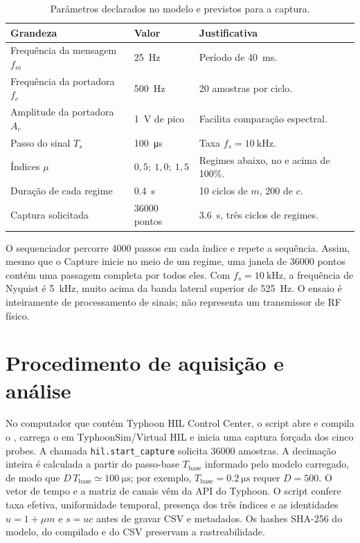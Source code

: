 \documentclass[11pt,a4paper]{article}
\newcommand{\arquivo}[1]{\texttt{\detokenize{#1}}}
\begin{document}
\begin{table}[htbp]
\centering
\caption{Parâmetros declarados no modelo e previstos para a captura.}
\label{tab:parametros}
\begin{tabular}{@{}l l l@{}}
\toprule
Grandeza & Valor & Justificativa\\
\midrule
Frequência da mensagem $f_m$ & \SI{25}{\hertz} & Período de \SI{40}{\milli\second}.\\
Frequência da portadora $f_c$ & \SI{500}{\hertz} & 20 amostras por ciclo.\\
Amplitude da portadora $A_c$ & \SI{1}{\volt} de pico & Facilita comparação espectral.\\
Passo do sinal $T_s$ & \SI{100}{\micro\second} & Taxa $f_s=\SI{10}{\kilo\hertz}$.\\
Índices $\mu$ & $0{,}5;\ 1{,}0;\ 1{,}5$ & Regimes abaixo, no e acima de 100\%.\\
Duração de cada regime & \SI{0.4}{\second} & 10 ciclos de $m$, 200 de $c$.\\
Captura solicitada & 36000 pontos & \SI{3.6}{\second}, três ciclos de regimes.\\
\bottomrule
\end{tabular}
\end{table}

O sequenciador percorre 4000 passos em cada índice e repete a sequência. Assim, mesmo que o Capture inicie no meio de um regime, uma janela de 36000 pontos contém uma passagem completa por todos eles. Com $f_s=\SI{10}{\kilo\hertz}$, a frequência de Nyquist é \SI{5}{\kilo\hertz}, muito acima da banda lateral superior de \SI{525}{\hertz}. O ensaio é inteiramente de processamento de sinais; não representa um transmissor de RF físico.

\section{Procedimento de aquisição e análise}
No computador que contém Typhoon HIL Control Center, o script \arquivo{capturar_vhil.py} abre e compila o \arquivo{.tse}, carrega o \arquivo{.cpd} em TyphoonSim/Virtual HIL e inicia uma captura forçada dos cinco probes. A chamada \texttt{hil.start\_capture} solicita 36000 amostras. A decimação inteira é calculada a partir do passo-base $T_{\mathrm{base}}$ informado pelo modelo carregado, de modo que $D\,T_{\mathrm{base}}\simeq\SI{100}{\micro\second}$; por exemplo, $T_{\mathrm{base}}=\SI{0.2}{\micro\second}$ requer $D=500$. O vetor de tempo e a matriz de canais vêm da API do Typhoon. O script confere taxa efetiva, uniformidade temporal, presença dos três índices e as identidades $u=1+\mu m$ e $s=uc$ antes de gravar CSV e metadados. Os hashes SHA-256 do modelo, do compilado e do CSV preservam a rastreabilidade.
\end{document}
